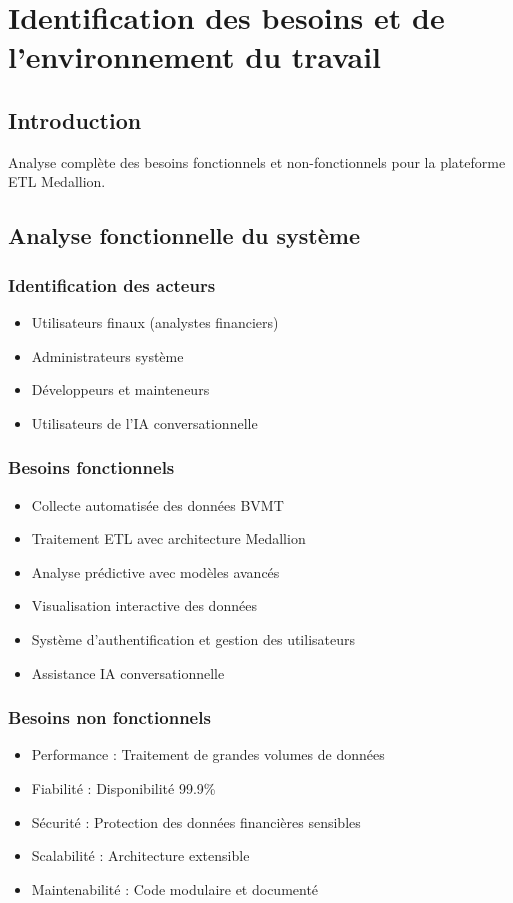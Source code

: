 \section{Identification des besoins et de l'environnement du travail}

\subsection{Introduction}
Analyse complète des besoins fonctionnels et non-fonctionnels pour la plateforme ETL Medallion.

\subsection{Analyse fonctionnelle du système}
\subsubsection{Identification des acteurs}
\begin{itemize}
    \item Utilisateurs finaux (analystes financiers)
    \item Administrateurs système
    \item Développeurs et mainteneurs
    \item Utilisateurs de l'IA conversationnelle
\end{itemize}

\subsubsection{Besoins fonctionnels}
\begin{itemize}
    \item Collecte automatisée des données BVMT
    \item Traitement ETL avec architecture Medallion
    \item Analyse prédictive avec modèles avancés
    \item Visualisation interactive des données
    \item Système d'authentification et gestion des utilisateurs
    \item Assistance IA conversationnelle
\end{itemize}

\subsubsection{Besoins non fonctionnels}
\begin{itemize}
    \item Performance : Traitement de grandes volumes de données
    \item Fiabilité : Disponibilité 99.9\%
    \item Sécurité : Protection des données financières sensibles
    \item Scalabilité : Architecture extensible
    \item Maintenabilité : Code modulaire et documenté
\end{itemize}

